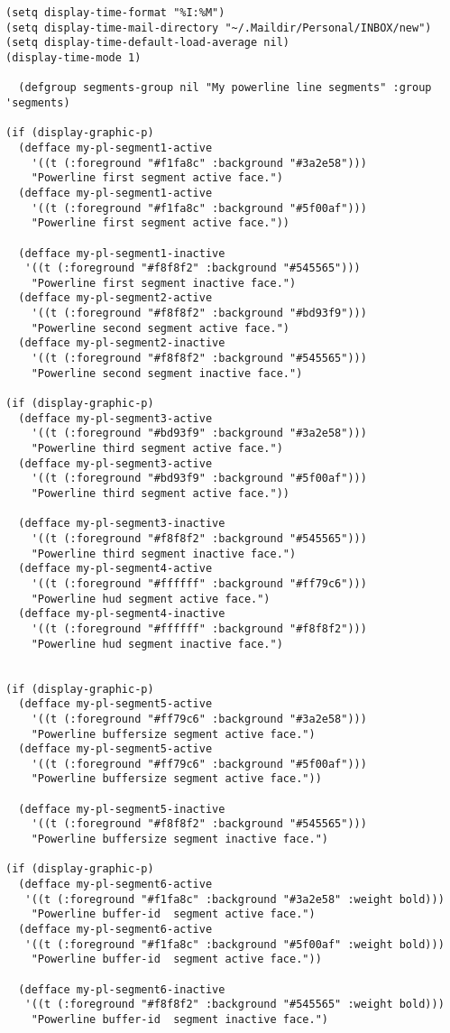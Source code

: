 \documentclass{article}
\begin{document}
\begin{verbatim}
(setq display-time-format "%I:%M")
(setq display-time-mail-directory "~/.Maildir/Personal/INBOX/new")
(setq display-time-default-load-average nil)
(display-time-mode 1)

  (defgroup segments-group nil "My powerline line segments" :group 'segments)

(if (display-graphic-p)
  (defface my-pl-segment1-active
    '((t (:foreground "#f1fa8c" :background "#3a2e58")))
    "Powerline first segment active face.")
  (defface my-pl-segment1-active
    '((t (:foreground "#f1fa8c" :background "#5f00af")))
    "Powerline first segment active face."))

  (defface my-pl-segment1-inactive
   '((t (:foreground "#f8f8f2" :background "#545565")))
    "Powerline first segment inactive face.")
  (defface my-pl-segment2-active
    '((t (:foreground "#f8f8f2" :background "#bd93f9")))
    "Powerline second segment active face.")
  (defface my-pl-segment2-inactive
    '((t (:foreground "#f8f8f2" :background "#545565")))
    "Powerline second segment inactive face.")

(if (display-graphic-p)
  (defface my-pl-segment3-active
    '((t (:foreground "#bd93f9" :background "#3a2e58")))
    "Powerline third segment active face.")
  (defface my-pl-segment3-active
    '((t (:foreground "#bd93f9" :background "#5f00af")))
    "Powerline third segment active face."))

  (defface my-pl-segment3-inactive
    '((t (:foreground "#f8f8f2" :background "#545565")))
    "Powerline third segment inactive face.")
  (defface my-pl-segment4-active
    '((t (:foreground "#ffffff" :background "#ff79c6")))
    "Powerline hud segment active face.")
  (defface my-pl-segment4-inactive
    '((t (:foreground "#ffffff" :background "#f8f8f2")))
    "Powerline hud segment inactive face.")


(if (display-graphic-p)
  (defface my-pl-segment5-active
    '((t (:foreground "#ff79c6" :background "#3a2e58")))
    "Powerline buffersize segment active face.")
  (defface my-pl-segment5-active
    '((t (:foreground "#ff79c6" :background "#5f00af")))
    "Powerline buffersize segment active face."))

  (defface my-pl-segment5-inactive
    '((t (:foreground "#f8f8f2" :background "#545565")))
    "Powerline buffersize segment inactive face.")

(if (display-graphic-p)
  (defface my-pl-segment6-active
   '((t (:foreground "#f1fa8c" :background "#3a2e58" :weight bold)))
    "Powerline buffer-id  segment active face.")
  (defface my-pl-segment6-active
   '((t (:foreground "#f1fa8c" :background "#5f00af" :weight bold)))
    "Powerline buffer-id  segment active face."))

  (defface my-pl-segment6-inactive
   '((t (:foreground "#f8f8f2" :background "#545565" :weight bold)))
    "Powerline buffer-id  segment inactive face.")
\end{verbatim}
\end{document}
